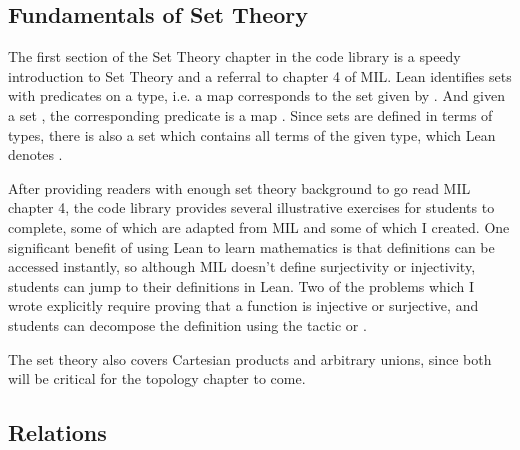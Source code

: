 \subsection{Fundamentals of Set Theory}

The first section of the Set Theory chapter in the code library is 
a speedy introduction to Set Theory and a referral to chapter 4 of
MIL. Lean identifies sets with predicates on a type, i.e. a map
 corresponds to the set  given by
. And given a set , the corresponding
predicate is a map . 
Since sets are defined in terms of types, there is also a set which contains 
all terms of the given type, which Lean denotes .

After providing readers with enough set theory background to go read 
MIL chapter 4, the code library provides several illustrative exercises for
students to complete, some of which are adapted from MIL and some of which I 
created. One significant benefit of using Lean to learn mathematics is that
definitions can be accessed instantly, so although MIL doesn't define 
surjectivity or injectivity, students can jump to their definitions in Lean.
Two of the problems which I wrote explicitly require proving that a function is
injective or surjective, and students can decompose the definition using the
tactic  or .

The set theory also covers Cartesian products and arbitrary unions, since
both will be critical for the topology chapter to come.

\subsection{Relations}

